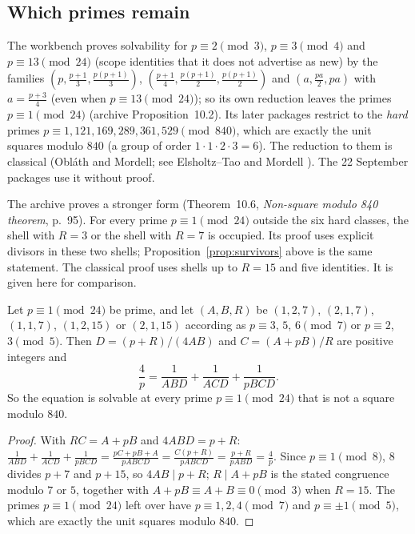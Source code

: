 \subsection{Which primes remain}

The workbench proves solvability for $p\equiv2\pmod 3$, $p\equiv3\pmod4$ and $p\equiv13\pmod{24}$ (scope identities that it does not advertise as new) by the families $(p,\frac{p+1}3,\frac{p(p+1)}3)$, $(\frac{p+1}4,\frac{p(p+1)}2,\frac{p(p+1)}2)$ and $(a,\frac{pa}2,pa)$ with $a=\frac{p+3}4$ (even when $p\equiv13\pmod{24}$); so its own reduction leaves the primes $p\equiv1\pmod{24}$ (archive Proposition~10.2). Its later packages restrict to the \emph{hard} primes $p\equiv1,121,169,289,361,529\pmod{840}$, which are exactly the unit squares modulo $840$ (a group of order $1\cdot1\cdot2\cdot3=6$). The reduction to them is classical (Obláth and Mordell; see Elsholtz--Tao \cite{ElsholtzTao} and Mordell \cite{Mordell}). The 22 September packages use it without proof.

The archive proves a stronger form (Theorem~10.6, \emph{Non-square modulo 840 theorem}, p.~95). For every prime $p\equiv1\pmod{24}$ outside the six hard classes, the shell with $R=3$ or the shell with $R=7$ is occupied. Its proof uses explicit divisors in these two shells; Proposition~\ref{prop:survivors} above is the same statement.
The classical proof uses shells up to $R=15$ and five identities. It is given here for comparison.

\begin{proposition}\label{prop:mod840}
Let $p\equiv1\pmod{24}$ be prime, and let $(A,B,R)$ be $(1,2,7)$, $(2,1,7)$, $(1,1,7)$, $(1,2,15)$ or $(2,1,15)$ according as $p\equiv3$, $5$, $6\pmod7$ or $p\equiv2$, $3\pmod5$. Then $D=(p+R)/(4AB)$ and $C=(A+pB)/R$ are positive integers and
\[
\frac4p=\frac1{ABD}+\frac1{ACD}+\frac1{pBCD}.
\]
So the equation is solvable at every prime $p\equiv1\pmod{24}$ that is not a square modulo $840$.
\end{proposition}
\begin{proof}
With $RC=A+pB$ and $4ABD=p+R$: $\frac1{ABD}+\frac1{ACD}+\frac1{pBCD}=\frac{pC+pB+A}{pABCD}=\frac{C(p+R)}{pABCD}=\frac{p+R}{pABD}=\frac4p$. Since $p\equiv1\pmod8$, $8$ divides $p+7$ and $p+15$, so $4AB\mid p+R$; $R\mid A+pB$ is the stated congruence modulo $7$ or $5$, together with $A+pB\equiv A+B\equiv0\pmod3$ when $R=15$. The primes $p\equiv1\pmod{24}$ left over have $p\equiv1,2,4\pmod7$ and $p\equiv\pm1\pmod5$, which are exactly the unit squares modulo $840$.
\end{proof}



